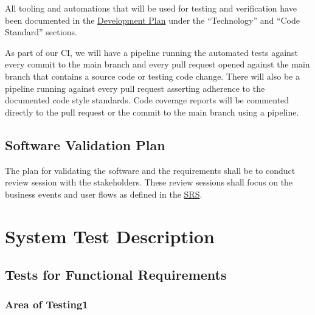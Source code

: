 \documentclass[12pt, titlepage]{article}
\begin{document}
All tooling and automations that will be used for testing and verification have been documented in
the
\href{https://github.com/arkinmodi/project-sayyara/blob/main/docs/DevelopmentPlan/DevelopmentPlan.pdf}{Development
	Plan} under the ``Technology'' and ``Code Standard'' sections.

As part of our CI, we will have a pipeline running the automated tests against every commit to the
main branch and every pull request opened against the main branch that contains a source code or
testing code change. There will also be a pipeline running against every pull request asserting
adherence to the documented code style standards. Code coverage reports will be commented directly
to the pull request or the commit to the main branch using a pipeline.

\subsection{Software Validation Plan}

The plan for validating the software and the requirements shall be to conduct review session with
the stakeholders. These review sessions shall focus on the business events and user flows as
defined in the \href{https://github.com/arkinmodi/project-sayyara/blob/main/docs/SRS/SRS.pdf}{SRS}.

\section{System Test Description}

\subsection{Tests for Functional Requirements}



\subsubsection{Area of Testing1}

\end{document}
